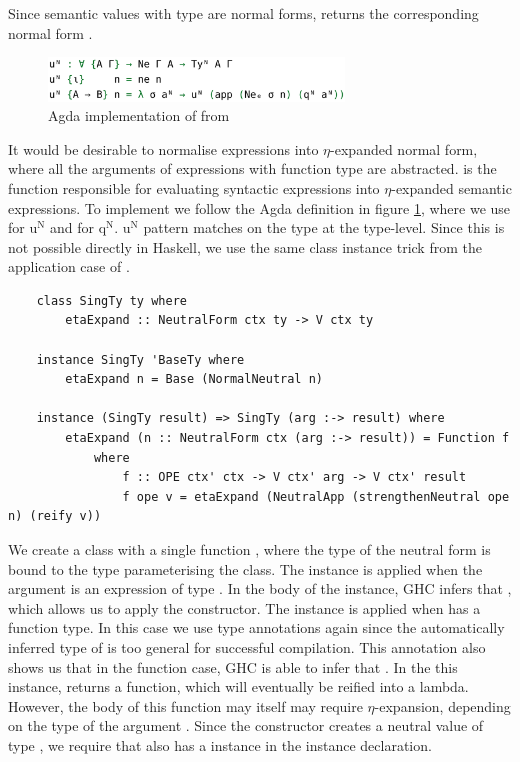 Since semantic values with type  are normal forms,  returns the corresponding normal form .

\begin{figure}[h]
    \centering
    \includegraphics[width=0.7\textwidth]{./images/agda_eta_expand.png}
    \caption{Agda implementation of  from \cite{AgdaNbe}}
    \label{fig:agdaEtaExpand}
\end{figure}

It would be desirable to normalise expressions into $\eta$-expanded normal form, where all the arguments of expressions with function type are abstracted.  is the function responsible for evaluating syntactic expressions into $\eta$-expanded semantic expressions. To implement  we follow the Agda definition in figure \ref{fig:agdaEtaExpand}, where we use  for $\text{u}^\text{N}$ and  for $\text{q}^\text{N}$. $\text{u}^\text{N}$ pattern matches on the type  at the type-level. Since this is not possible directly in Haskell, we use the same class instance trick from the application case of . 

\begin{lstlisting}
    class SingTy ty where
        etaExpand :: NeutralForm ctx ty -> V ctx ty

    instance SingTy 'BaseTy where
        etaExpand n = Base (NormalNeutral n)

    instance (SingTy result) => SingTy (arg :-> result) where
        etaExpand (n :: NeutralForm ctx (arg :-> result)) = Function f 
            where
                f :: OPE ctx' ctx -> V ctx' arg -> V ctx' result
                f ope v = etaExpand (NeutralApp (strengthenNeutral ope n) (reify v))  
\end{lstlisting}

We create a class  with a single function , where the type of the neutral form is bound to the type  parameterising the class. The  instance is applied when the argument  is an expression of type . In the body of the instance, GHC infers that , which allows us to apply the  constructor. The \code{:->} instance is applied when  has a function type. In this case we use type annotations again since the automatically inferred type of  is too general for successful compilation. This annotation also shows us that in the function case, GHC is able to infer that . In the this instance,  returns a function, which will eventually be reified into a lambda. However, the body of this function may itself may require $\eta$-expansion, depending on the type of the argument . Since the  constructor creates a neutral value of type , we require that  also has a  instance in the instance declaration.

